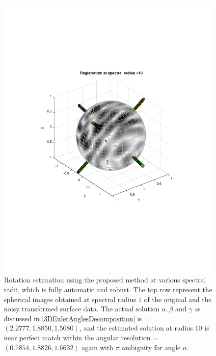 \documentclass{UCF_ETD}
\begin{document}
\begin{figure}[H]
\begin{center}
\includegraphics[scale=0.32]{RobustRegistration/NoisyTransReg_10}
\caption{Rotation estimation using the proposed method at various spectral radii, which is fully automatic and robust. The top row represent the spherical images obtained at spectral radius $1$ of the original and the noisy transformed surface data. The actual solution $\alpha, \beta $ and $\gamma$ as discussed in \eqref{3DEulerAnglesDecomposition} is = $(2.2777, 1.8850, 1.5080) $, and the estimated solution at radius $10$ is near perfect match within the angular resolution = $(0.7854, 1.8826, 1.6632)$ again with $\pi$ ambiguity for angle $\alpha$. }
\label{SurfaceWithHolesRotationEstimation.fig}
\end{center}
\end{figure}
\end{document}

